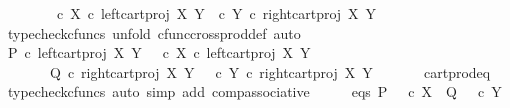 \begin{isabellebody}
\ \ \ \ \ \ {\isacharequal}{\kern0pt}\ {\isasymlangle}{\isasymf}\ {\isasymcirc}\isactrlsub c\ {\isasymbeta}\isactrlbsub X\isactrlesub \ {\isasymcirc}\isactrlsub c\ left{\isacharunderscore}{\kern0pt}cart{\isacharunderscore}{\kern0pt}proj\ X\ Y{\isacharcomma}{\kern0pt}\ {\isasymf}\ {\isasymcirc}\isactrlsub c\ {\isasymbeta}\isactrlbsub Y\isactrlesub \ {\isasymcirc}\isactrlsub c\ right{\isacharunderscore}{\kern0pt}cart{\isacharunderscore}{\kern0pt}proj\ X\ Y{\isasymrangle}{\isachardoublequoteclose}\isanewline
\ \ \ \ \isamarkupfalse%
\ {\isacharparenleft}{\kern0pt}typecheck{\isacharunderscore}{\kern0pt}cfuncs{\isacharcomma}{\kern0pt}\ unfold\ cfunc{\isacharunderscore}{\kern0pt}cross{\isacharunderscore}{\kern0pt}prod{\isacharunderscore}{\kern0pt}def{}{\isacharcomma}{\kern0pt}\ auto{\isacharparenright}{\kern0pt}\isanewline
\ \ \isamarkupfalse%
\ \isamarkupfalse%
\ {\isachardoublequoteopen}{\isacharparenleft}{\kern0pt}P\ {\isasymcirc}\isactrlsub c\ left{\isacharunderscore}{\kern0pt}cart{\isacharunderscore}{\kern0pt}proj\ X\ Y\ {\isacharequal}{\kern0pt}\ {\isacharparenleft}{\kern0pt}{\isasymf}\ {\isasymcirc}\isactrlsub c\ {\isasymbeta}\isactrlbsub X\isactrlesub {\isacharparenright}{\kern0pt}\ {\isasymcirc}\isactrlsub c\ left{\isacharunderscore}{\kern0pt}cart{\isacharunderscore}{\kern0pt}proj\ X\ Y{\isacharparenright}{\kern0pt}\isanewline
\ \ \ \ \ \ {\isasymand}\ {\isacharparenleft}{\kern0pt}Q\ {\isasymcirc}\isactrlsub c\ right{\isacharunderscore}{\kern0pt}cart{\isacharunderscore}{\kern0pt}proj\ X\ Y\ {\isacharequal}{\kern0pt}\ {\isacharparenleft}{\kern0pt}{\isasymf}\ {\isasymcirc}\isactrlsub c\ {\isasymbeta}\isactrlbsub Y\isactrlesub {\isacharparenright}{\kern0pt}\ {\isasymcirc}\isactrlsub c\ right{\isacharunderscore}{\kern0pt}cart{\isacharunderscore}{\kern0pt}proj\ X\ Y{\isacharparenright}{\kern0pt}{\isachardoublequoteclose}\isanewline
\ \ \ \ \isamarkupfalse%
\ \ cart{\isacharunderscore}{\kern0pt}prod{\isacharunderscore}{\kern0pt}eq{}\ \isamarkupfalse%
\ {\isacharparenleft}{\kern0pt}typecheck{\isacharunderscore}{\kern0pt}cfuncs{\isacharcomma}{\kern0pt}\ auto\ simp\ add{\isacharcolon}{\kern0pt}\ comp{\isacharunderscore}{\kern0pt}associative{}{\isacharparenright}{\kern0pt}\isanewline
\ \ \isamarkupfalse%
\ \isamarkupfalse%
\ eqs{\isacharcolon}{\kern0pt}\ {\isachardoublequoteopen}{\isacharparenleft}{\kern0pt}P\ {\isacharequal}{\kern0pt}\ {\isasymf}\ {\isasymcirc}\isactrlsub c\ {\isasymbeta}\isactrlbsub X\isactrlesub {\isacharparenright}{\kern0pt}\ {\isasymand}\ {\isacharparenleft}{\kern0pt}Q\ {\isacharequal}{\kern0pt}\ {\isasymf}\ {\isasymcirc}\isactrlsub c\ {\isasymbeta}\isactrlbsub Y\isactrlesub {\isacharparenright}{\kern0pt}{\isachardoublequoteclose}\isanewline

\end{isabellebody}
